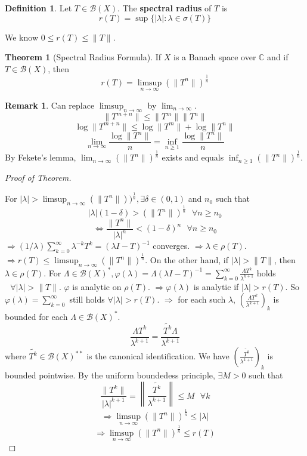 \documentclass{article}
\newcommand{\sfa}{\text{  } \forall}
\theoremstyle{definition}
\newtheorem{thm}{Theorem}
\newtheorem{dfn}{Definition}
\newtheorem{rem}{Remark}
\newenvironment{proofs}[1][\proofname]{%
  \begin{proof}[#1]$ $\par\nobreak\ignorespaces
}{%
  \end{proof}
}
\begin{document}
\begin{dfn}
	Let $T \in \mathcal{B}(X)$.
	The \textbf{spectral radius} of $T$ is 
	\[
		r(T) = \sup \{|\lambda|: \lambda \in \sigma(T)\}
	\]
\end{dfn}

We know $0 \leq r(T) \leq \|T\|$.

\begin{thm}[Spectral Radius Formula]
	If $X$ is a Banach space over $\mathbb{C}$ and if $T \in \mathcal{B}(X)$, then
	\[
		r(T) = \limsup_{n \to \infty} (\|T^n\|)^{\frac{1}{n}}
	\]
\end{thm}

\begin{rem}
	Can replace $\limsup_{n \to \infty}$ by $\lim_{n \to \infty}$.
	\[
		\|T^{m + n} \| \leq \| T^m\|\|T^n\|
	\]
	\[
		\log \|T^{m + n}\| \leq \log \|T^m\| + \log \|T^n\|
	\]
	\[
		\lim_{n \to \infty} \frac{\log \|T^n\|}{n} = \inf_{n \geq 1} \frac{\log \|T^n\|}{n}
	\]
	By Fekete's lemma, $\lim_{n \to \infty}(\|T^n\|)^{\frac{1}{n}}$ exists and equals $\inf_{n \geq 1}(\|T^n\|)^{\frac{1}{n}}$.
\end{rem}

\begin{proofs}[Proof of Theorem]
	For $|\lambda| > \limsup_{n \to \infty} (\|T^n\|))^\frac{1}{n}, \exists \delta \in (0, 1)$ and $n_0$ such that
	\[
		|\lambda|(1 - \delta) > (\|T^n\|)^{\frac{1}{n}} \sfa n \geq n_0
	\]
	\[
		\Leftrightarrow \frac{\|T^n\|}{|\lambda|^n} < (1 - \delta)^n \sfa n \geq n_0
	\]
	$\Rightarrow (1/\lambda) \sum_{k = 0}^\infty \lambda^{-k} T^k = (\lambda I - T)^{-1}$ converges.
	$\Rightarrow \lambda \in \rho(T)$.
	$\Rightarrow r(T) \leq \limsup_{n \to \infty} (\|T^n\|)^{\frac{1}{n}}$.
	On the other hand, if $|\lambda| > \|T\|$, then $\lambda \in \rho(T)$.
	For $\Lambda \in \mathcal{B}(X)^*, \varphi(\lambda) = \Lambda(\lambda I - T)^{-1} = \sum_{k = 0}^\infty \frac{\Lambda T^k}{\lambda^{k + 1}}$ holds $\sfa |\lambda| > \|T\|$.
	$\varphi$ is analytic on $\rho(T)$.
	$\Rightarrow \varphi(\lambda)$ is analytic if $|\lambda| > r(T)$.
	So $\varphi(\lambda) = \sum_{k = 0}^\infty$ still holds $\forall |\lambda| > r(T)$.
	$\Rightarrow$ for each such $\lambda$, $\left(\frac{\Lambda T^k}{\lambda^{k + 1}} \right)_k$ is bounded for each $\Lambda \in \mathcal{B}(X)^*$.
	\[
		\frac{\Lambda T^k}{\lambda^{k + 1}} = \frac{\tilde{T^k} \Lambda}{\lambda^{k + 1}}
	\]
	where $\tilde{T^k} \in \mathcal{B}(X)^{**}$ is the canonical identification.
	We have $\left( \frac{\tilde{T^k}}{\lambda^{k + 1}} \right)_k$ is bounded pointwise.
	By the uniform boundedess principle, $\exists M > 0$ such that 
	\[
		\frac{\|T^k\|}{|\lambda|^{k + 1}} = \left\|\frac{\tilde{T^k}}{\lambda^{k + 1}} \right\| \leq M \sfa k
	\]
	\[
		\Rightarrow \limsup_{n \to \infty} (\|T^n\|)^{\frac{1}{n}} \leq |\lambda|
	\]
	\[
		\Rightarrow \limsup_{n \to \infty} (\|T^n\|)^{\frac{1}{n}} \leq r(T)
	\]
\end{proofs}
\end{document}

